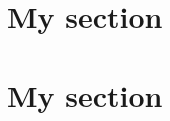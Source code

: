 \documentclass{article}
\begin{document}
\section{My section}
\lipsum[1-9]

\section{My section}
\lipsum[10-12]
\end{document}
